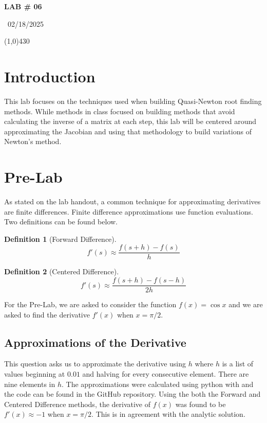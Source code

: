 \documentclass{article}
\newtheorem{definition}{Definition}[section]
\begin{document}
\begin{center}
 \LARGE\bfseries LAB \# 06
\end{center}
\begin{center}
    ~02/18/2025~
\end{center}
 \line(1,0){430}

\section{Introduction}
This lab focuses on the techniques used when building Quasi-Newton root finding methods. While methods in class focused on building methods that avoid calculating the inverse of a matrix at each step, this lab will be centered around approximating the Jacobian and using that methodology to build variations of Newton's method.

\section{Pre-Lab}
As stated on the lab handout, a common technique for approximating derivatives are finite differences. Finite difference approximations use function evaluations. Two definitions can be found below.
\begin{definition}[Forward Difference]
    \[
    f'(s) \approx \frac{f(s+h)-f(s)}{h}
    \]
\end{definition}

\begin{definition}[Centered Difference]
    \[
    f'(s) \approx \frac{f(s+h) - f(s-h)}{2h}
    \]
\end{definition}
For the Pre-Lab, we are asked to consider the function \(f(x) = \cos{x}\) and we are asked to find the derivative \(f'(x)\) when \(x=\pi/2\).

\subsection{Approximations of the Derivative}
This question asks us to approximate the derivative using \(h\) where \(h\) is a list of values beginning at \(0.01\) and halving for every consecutive element. There are nine elements in \(h\). The approximations were calculated using python with and the code can be found in the GitHub repository. Using the both the Forward and Centered Difference methods, the derivative of \(f(x)\) was found to be \(f'(x)\approx -1\) when \(x=\pi/2\). This is in agreement with the analytic solution.
\end{document}
